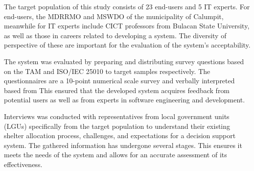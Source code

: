 \documentclass[12pt,a4paper,]{article}
\begin{document}
	The target population of this study consists of 23 end-users and 5 IT experts. For end-users, the MDRRMO and MSWDO of the municipality of Calumpit, meanwhile for IT experts include CICT professors from Bulacan State University, as well as those in careers related to developing a system. The diversity of perspective of these are important for the evaluation of the system’s acceptability.
	
	The system was evaluated by preparing and distributing survey questions based on the TAM and ISO/IEC 25010 to target samples respectively. The questionnaires are a 10-point numerical scale survey and verbally interpreted based from \textcite{Eladia2024} This ensured that the developed system acquires feedback from potential users as well as from experts in software engineering and development.
	
	Interviews was conducted with representatives from local government units (LGUs) specifically from the target population to understand their existing shelter allocation process, challenges, and expectations for a decision support system. The gathered information has undergone several stages. This ensures it meets the needs of the system and allows for an accurate assessment of its effectiveness.
	
\end{document}
